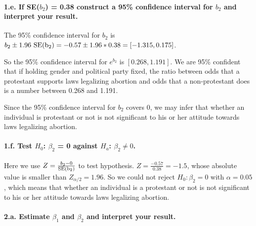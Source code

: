 \documentclass[]{article}
\let\oldparagraph\paragraph
\renewcommand{\paragraph}[1]{\oldparagraph{#1}\mbox{}}
\begin{document}
\hypertarget{e.-if-seb_2-0.38-construct-a-95-confidence-interval-for-b_2-and-interpret-your-result.}{%
\paragraph{\texorpdfstring{1.e. If SE(\(b_2\)) = 0.38 construct a 95\%
confidence interval for \(b_2\) and interpret your
result.}{1.e. If SE(b\_2) = 0.38 construct a 95\% confidence interval for b\_2 and interpret your result.}}\label{e.-if-seb_2-0.38-construct-a-95-confidence-interval-for-b_2-and-interpret-your-result.}}

The 95\% confidence interval for \(b_2\) is
\(b_2 \pm 1.96\ \rm{SE}(b_2) = -0.57 \pm 1.96*0.38 = [-1.315, 0.175]\).

So the 95\% confidence interval for \(e^{b_2}\) is \([0.268, 1.191]\).
We are 95\% confident that if holding gender and political party fixed,
the ratio between odds that a protestant supports laws legalizing
abortion and odds that a non-protestant does is a number between 0.268
and 1.191.

Since the 95\% confidence interval for \(b_2\) covers 0, we may infer
that whether an individual is protestant or not is not significant to
his or her attitude towards laws legalizing abortion.

\hypertarget{f.-test-h_0-beta_2-0-against-h_a-beta_2-neq-0.}{%
\paragraph{\texorpdfstring{1.f. Test \(H_0\): \(\beta_2\) = 0 against
\(H_a\):
\(\beta_2 \neq 0\).}{1.f. Test H\_0: \textbackslash{}beta\_2 = 0 against H\_a: \textbackslash{}beta\_2 \textbackslash{}neq 0.}}\label{f.-test-h_0-beta_2-0-against-h_a-beta_2-neq-0.}}

Here we use \(Z = \frac{b_2 - 0}{\rm{SE}(b_2)}\) to test hypothesis.
\(Z = \frac{-0.57}{0.38} = -1.5\), whose absolute value is smaller than
\(Z_{\alpha/2} = 1.96\). So we could not reject \(H_0: \beta_2 = 0\)
with \(\alpha = 0.05\), which means that whether an individual is a
protestant or not is not significant to his or her attitude towards laws
legalizing abortion.

\hypertarget{a.-estimate-beta_1-and-beta_2-and-interpret-your-result.}{%
\paragraph{\texorpdfstring{2.a. Estimate \(\beta_1\) and \(\beta_2\) and
interpret your
result.}{2.a. Estimate \textbackslash{}beta\_1 and \textbackslash{}beta\_2 and interpret your result.}}\label{a.-estimate-beta_1-and-beta_2-and-interpret-your-result.}}
\end{document}
